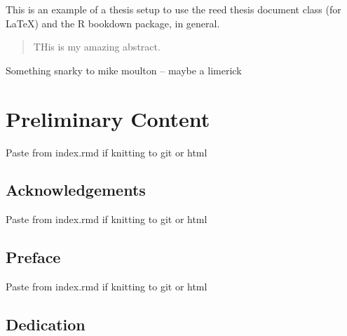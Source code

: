 \documentclass[12pt,twoside]{reedthesis}
\begin{document}
  \begin{preface}
    This is an example of a thesis setup to use the reed thesis document
    class (for LaTeX) and the R bookdown package, in general.
  \end{preface}
  \hypersetup{linkcolor=black}
  \setcounter{tocdepth}{2}
  \tableofcontents

  \listoftables

  \listoffigures
  \begin{abstract}
    THis is my amazing abstract.
  \end{abstract}
  \begin{dedication}
    Something snarky to mike moulton -- maybe a limerick
  \end{dedication}
\mainmatter %
\pagestyle{fancyplain} %

\hypertarget{section}{\chapter*{}\label{section}}

\chapter*{Preliminary Content}\label{preliminary-content}

Paste from index.rmd if knitting to git or html

\section*{Acknowledgements}\label{acknowledgements}

Paste from index.rmd if knitting to git or html

\section*{Preface}\label{preface}

Paste from index.rmd if knitting to git or html

\section*{Dedication}\label{dedication}
\end{document}
